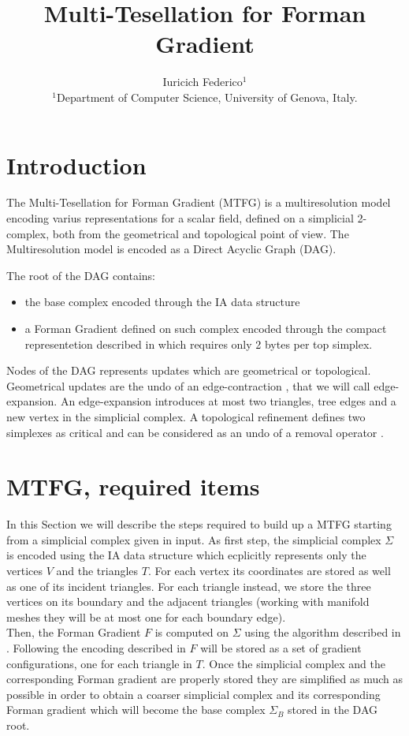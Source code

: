 \documentclass[preprint,5p,times,onecolumn]{article}
\title{Multi-Tesellation for Forman Gradient}
\author{Iuricich Federico$^{1}$ \\
         $^1$Department of Computer Science, University of Genova, Italy.
         }
\begin{document}
\section{Introduction}

The Multi-Tesellation for Forman Gradient (MTFG) is a multiresolution model encoding varius representations for a scalar field, defined on a simplicial 2-complex, both from the geometrical and topological point of view.
The Multiresolution model is encoded as a Direct Acyclic Graph (DAG). 

\noindent
The root of the DAG contains:
\begin{itemize}
	\item the base complex encoded through the IA data structure \cite{Niel97}
	\item a Forman Gradient defined on such complex encoded through the compact representetion described in \cite{weiss13} which requires only 2 bytes per top simplex.
\end{itemize}

Nodes of the DAG represents updates which are geometrical or topological. Geometrical updates are the undo of an edge-contraction \cite{Dey13}, that we will call edge-expansion. An edge-expansion introduces at most two triangles, tree edges and a new vertex in the simplicial complex. A topological refinement defines two simplexes as critical and can be considered as an undo of a removal operator \cite{Comi11}.


\section{MTFG, required items}
\label{sec:build}

In this Section we will describe the steps required to build up a MTFG starting from a simplicial complex given in input. As first step, the simplicial complex $\Sigma$ is encoded using the IA data structure which ecplicitly represents only the vertices $V$ and the triangles $T$. For each vertex its coordinates are stored as well as one of its incident triangles. For each triangle instead, we store the three vertices on its boundary and the adjacent triangles (working with manifold meshes they will be at most one for each boundary edge).\\

Then, the Forman Gradient $F$ is computed on $\Sigma$ using the algorithm described in \cite{Robin11}. Following the encoding described in \cite{weiss13} $F$ will be stored as a set of gradient configurations, one for each triangle in $T$.
Once the simplicial complex and the corresponding Forman gradient are properly stored they are simplified as much as possible in order to obtain a coarser simplicial complex and its corresponding Forman gradient which will become the base complex $\Sigma_B$ stored in the DAG root.
\end{document}
